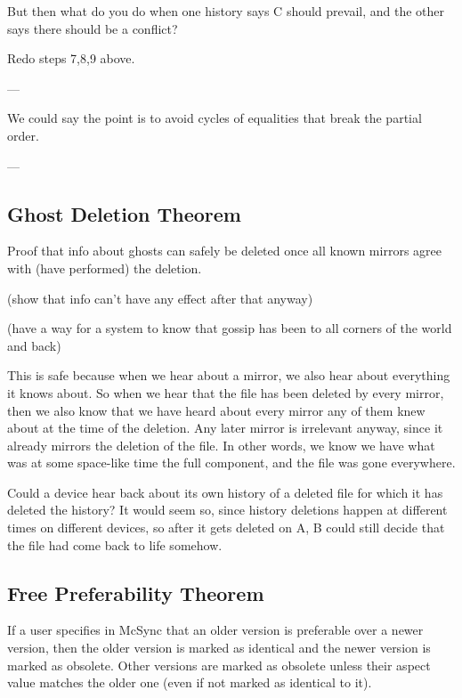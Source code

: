 \documentclass{book}
\begin{document}
But then what do you do when one history says C should prevail, and the other says there should be a conflict?

Redo steps 7,8,9 above.

---

We could say the point is to avoid cycles of equalities that break the partial order.

---





\subsection{Ghost Deletion Theorem}

Proof that info about ghosts can safely be deleted once all known mirrors agree with (have performed) the deletion.

(show that info can't have any effect after that anyway)

(have a way for a system to know that gossip has been to all corners of the world and back)

This is safe because when we hear about a mirror, we also hear about everything it knows about.  So when we hear that the file has been deleted by every mirror, then we also know that we have heard about every mirror any of them knew about at the time of the deletion.  Any later mirror is irrelevant anyway, since it already mirrors the deletion of the file.  In other words, we know we have what was at some space-like time the full component, and the file was gone everywhere.

Could a device hear back about its own history of a deleted file for which it has deleted the history?  It would seem so, since history deletions happen at different times on different devices, so after it gets deleted on A, B could still decide that the file had come back to life somehow.



\subsection{Free Preferability Theorem}

If a user specifies in McSync that an older version is preferable over a newer version, then the older version is marked as identical and the newer version is marked as obsolete.  Other versions are marked as obsolete unless their aspect value matches the older one (even if not marked as identical to it).
\end{document}
